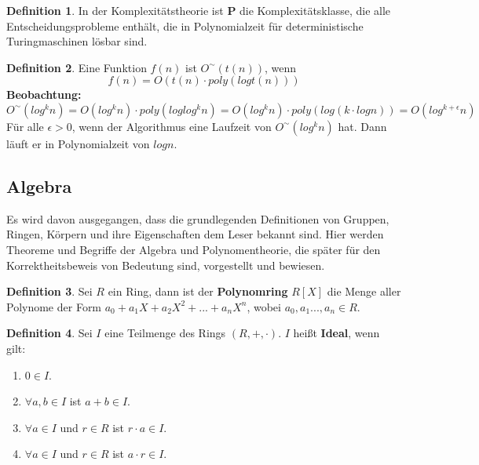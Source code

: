 \documentclass[12pt,oneside]{article}
\theoremstyle{remark}
\theoremstyle{definition}
\newtheorem{definition}{Definition}[section]
\begin{document}
\begin{definition}
In der Komplexitätstheorie ist \textbf{P} die Komplexitätsklasse, die alle Entscheidungsprobleme enthält, die in Polynomialzeit für deterministische Turingmaschinen lösbar sind. 
\end{definition}

\begin{definition}
Eine Funktion $f(n)$ ist $ O^{\sim}(t(n))$, wenn
\begin{equation}
    f(n) = O(t(n) \cdot poly(log t(n)))
\end{equation}
\textbf{Beobachtung:}
\begin{equation}
    O^{\sim}(log^k n) = O(log^k n) \cdot poly(log log^k n) = O(log^k n) \cdot poly(log( k \cdot log n)) = O(log^{k+\epsilon}n)
\end{equation}
Für alle $\epsilon > 0$, wenn der Algorithmus eine Laufzeit von $O^{\sim}(log^k n)$ hat. Dann läuft er in Polynomialzeit von $log n$.
\end{definition}


\subsection{Algebra}
Es wird davon ausgegangen, dass die grundlegenden Definitionen von Gruppen, Ringen, Körpern und ihre Eigenschaften dem Leser bekannt sind. Hier werden Theoreme und Begriffe der Algebra und Polynomentheorie, die später für den Korrektheitsbeweis von Bedeutung sind, vorgestellt und bewiesen.\newline

\begin{definition}
Sei $R$ ein Ring, dann ist der \textbf{Polynomring} $R[X]$ die Menge aller Polynome der Form $a_{0} + a_{1}X + a_{2} X^2 + ... + a_{n}X^n$, wobei $a_{0},a_{1}...,a_{n} \in R$.
\end{definition}

\smallskip

\begin{definition}
Sei $I$ eine Teilmenge des Rings $(R,+,\cdot)$. $I$ heißt \textbf{Ideal}, wenn gilt:
\begin{enumerate}
    \item $0 \in I$.
    \item $\forall a,b \in I$ ist $a + b \in I$.
    \item $\forall a \in I$ und $r \in R$ ist $r \cdot a \in I$.
    \item $\forall a \in I$ und $r \in R$ ist $a \cdot r \in I$.
\end{enumerate}
\end{definition}
\end{document}

